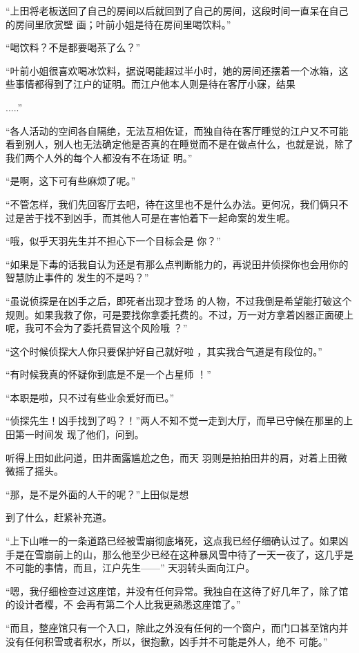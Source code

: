 \documentclass{article}
\begin{document}
“上田将老板送回了自己的房间以后就回到了自己的房间，这段时间一直呆在自己的房间里欣赏壁
画；叶前小姐是待在房间里喝饮料。” 


“喝饮料？不是都要喝茶了么？” 

“叶前小姐很喜欢喝冰饮料，据说喝能超过半小时，她的房间还摆着一个冰箱，这些事情都得到了江户的证明。而江户他本人则是待在客厅小寐，结果

\newpage
.....” 

“各人活动的空间各自隔绝，无法互相佐证，而独自待在客厅睡觉的江户又不可能看到别人，别人也无法确定他是否真的在睡觉而不是在做点什么，也就是说，除了我们两个人外的每个人都没有不在场证
明。” 


“是啊，这下可有些麻烦了呢。” 

“不管怎样，我们先回客厅去吧，待在这里也不是什么办法。更何况，我们俩只不过是苦于找不到凶手，而其他人可是在害怕着下一起命案的发生呢。

“哦，似乎天羽先生并不担心下一个目标会是
你？” 

“如果是下毒的话我自认为还是有那么点判断能力的，再说田井侦探你也会用你的智慧防止事件的
发生的不是吗？” 

“虽说侦探是在凶手之后，即死者出现才登场
\newpage
的人物，不过我倒是希望能打破这个规则。如果我救了你，可是要找你拿委托费的。不过，万一对方拿着凶器正面硬上呢，我可不会为了委托费冒这个风险哦
？” 

“这个时候侦探大人你只要保护好自己就好啦
，其实我合气道是有段位的。” 

“有时候我真的怀疑你到底是不是一个占星师
！” 


“本职是啦，只不过有些业余爱好而已。” 

“侦探先生！凶手找到了吗？！”两人不知不觉一走到大厅，而早已守候在那里的上田第一时间发
现了他们，问到。 

听得上田如此问道，田井面露尴尬之色，而天
羽则是拍拍田井的肩，对着上田微微摇了摇头。 

“那，是不是外面的人干的呢？”上田似是想
\newpage

到了什么，赶紧补充道。 

“上下山唯一的一条道路已经被雪崩彻底堵死，这点我已经仔细确认过了。如果凶手是在雪崩前上的山，那么他至少已经在这种暴风雪中待了一天一夜了，这几乎是不可能的事情，而且，江户先生——”
天羽转头面向江户。 

“嗯，我仔细检查过这座馆，并没有任何异常。我独自在这待了好几年了，除了馆的设计者樱，不
会再有第二个人比我更熟悉这座馆了。” 

“而且，整座馆只有一个入口，除此之外没有任何的一个窗户，而门口甚至馆内并没有任何积雪或者积水，所以，很抱歉，凶手并不可能是外人，绝不
可能。” 
\end{document}
